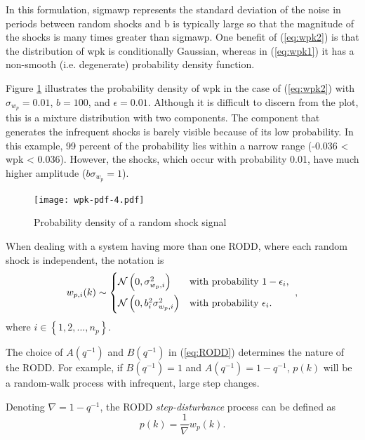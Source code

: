 In this formulation, \gls{sigmawp} represents the standard deviation of the noise in periods between random shocks and \gls{b} is typically large so that the magnitude of the shocks is many times greater than \gls{sigmawp}. One benefit of (\ref{eq:wpk2}) is that the distribution of \gls{wpk} is conditionally Gaussian, whereas in (\ref{eq:wpk1}) it has a non-smooth (i.e. degenerate) probability density function.

Figure \ref{fig:wpk-pdf} illustrates the probability density of \gls{wpk} in the case of (\ref{eq:wpk2}) with $\sigma_{w_p}=0.01$, $b=100$, and $\epsilon=0.01$. Although it is difficult to discern from the plot, this is a mixture distribution with two components. The component that generates the infrequent shocks is barely visible because of its low probability. In this example, 99 percent of the probability lies within a narrow range (-0.036 < \gls{wpk} < 0.036). However, the shocks, which occur with probability 0.01, have much higher amplitude ($b\sigma_{w_p}=1$).

\begin{figure}[htp]
	\centering
	\texttt{[image: wpk-pdf-4.pdf]}
	\caption{Probability density of a random shock signal}
	\label{fig:wpk-pdf}
\end{figure}

When dealing with a system having more than one RODD, where each random shock is independent, the notation is
\begin{equation} \label{eq:wpik2}
	w_{p,i}(k) \sim 
	\begin{cases*}
		\mathcal{N}\left(0, \sigma_{w_p,i}^2\right) & with probability $1-\epsilon_i$, \\
		\mathcal{N}\left(0, b_i^2\sigma_{w_p,i}^2\right) & with probability $\epsilon_i$.
	\end{cases*},
\end{equation}
where $i \in \left\{1, 2, ..., n_p\right\}$.

The choice of $A(q^{-1})$ and $B(q^{-1})$ in (\ref{eq:RODD}) determines the nature of the RODD. For example, if $B(q^{-1})=1$ and $A(q^{-1})=1-q^{-1}$, $p(k)$ will be a random-walk process with infrequent, large step changes.

Denoting $\nabla=1-q^{-1}$, the RODD \textit{step-disturbance} process can be defined as
\begin{equation} \label{eq:RODD-step}
	p(k)= \frac{1}{\nabla}w_p(k).
\end{equation}

